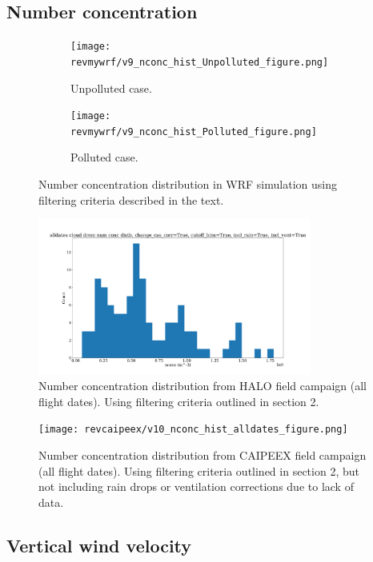 \documentclass{article}
\begin{document}
\subsection{Number concentration}

\begin{figure}[ht]
	\centering
	\begin{subfigure}{0.7\textwidth}
		\texttt{[image: revmywrf/v9\_nconc\_hist\_Unpolluted\_figure.png]}
		\caption{Unpolluted case.}
		\label{wrfnconchistunpoll}
	\end{subfigure}
	\begin{subfigure}{0.7\textwidth}
		\texttt{[image: revmywrf/v9\_nconc\_hist\_Polluted\_figure.png]}
		\caption{Polluted case.}
		\label{wrfnconchistpoll}
	\end{subfigure}
	\caption{Number concentration distribution in WRF simulation using filtering criteria described in the text.}
	\label{wrfnconchist}
\end{figure}
\begin{figure}[ht]
    \centering
    \includegraphics[width=9cm]{revhalo/v24_nconc_hist_cas_alldates_figure.png}
    \caption{Number concentration distribution from HALO field campaign (all flight dates). Using filtering criteria outlined in section 2.}
    \label{haloqsshist}
\end{figure}
\begin{figure}[ht]
    \centering
    \texttt{[image: revcaipeex/v10\_nconc\_hist\_alldates\_figure.png]}
    \caption{Number concentration distribution from CAIPEEX field campaign (all flight dates). Using filtering criteria outlined in section 2, but not including rain drops or ventilation corrections due to lack of data.}
    \label{caipeexqsshist}
\end{figure}

\subsection{Vertical wind velocity}
\end{document}
